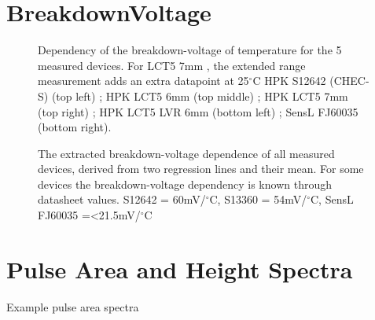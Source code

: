 \documentclass[12pt,article,type=msc,colorback,accentcolor=tud9c]{tudthesis}
\begin{document}
{\clearpage
\section{BreakdownVoltage}
\begin{figure}[h]
\begin{centering}
\caption{Dependency of the breakdown-voltage of temperature for the 5 measured devices. For LCT5 7mm , the extended range measurement adds an extra datapoint at 25$^\circ$C HPK S12642 (CHEC-S) (top left) ; HPK LCT5 6mm (top middle) ; HPK LCT5 7mm (top right) ; HPK LCT5 LVR 6mm (bottom left) ; SensL FJ60035 (bottom right).}
\label{app:Device_Vbr}
\end{centering}
\end{figure}

\begin{figure}[h]
\begin{centering}
\caption{The extracted breakdown-voltage dependence of all measured devices, derived from two regression lines and their mean. For some devices the breakdown-voltage dependency is known through datasheet values. S12642 = 60mV/$^\circ$C, S13360 = 54mV/$^\circ$C, SensL FJ60035 =<21.5mV/$^\circ$C }
\label{app:Device_Vbr_Table}
\end{centering}
\end{figure}







\clearpage
\section{Pulse Area and Height Spectra}
\label{app:PAS_Clean}
Example pulse area spectra



}
\end{document}
